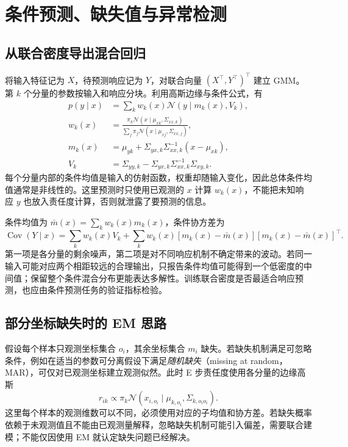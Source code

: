 \documentclass[UTF8,12pt,a4paper,fontset=fandol]{ctexart}
\begin{document}
\section{条件预测、缺失值与异常检测}
\label{sec:gmm-applications}

\subsection{从联合密度导出混合回归}
将输入特征记为 $X$，待预测响应记为 $Y$，对联合向量 $(X^\top,Y^\top)^\top$ 建立 GMM。第 $k$ 个分量的参数按输入和响应分块。利用高斯边缘与条件公式，有
\begin{align}
p(y\mid x)&=\sum_kw_k(x)\mathcal N(y\mid m_k(x),V_k),\label{eq:gmm-conditional-mixture}\\
w_k(x)&=\frac{\pi_k\mathcal N(x\mid\mu_{xk},\Sigma_{xx,k})}
{\sum_j\pi_j\mathcal N(x\mid\mu_{xj},\Sigma_{xx,j})},\nonumber\\
m_k(x)&=\mu_{yk}+\Sigma_{yx,k}\Sigma_{xx,k}^{-1}(x-\mu_{xk}),\nonumber\\
V_k&=\Sigma_{yy,k}-\Sigma_{yx,k}\Sigma_{xx,k}^{-1}\Sigma_{xy,k}.\nonumber
\end{align}
每个分量内部的条件均值是输入的仿射函数，权重却随输入变化，因此总体条件均值通常是非线性的。这里预测时只使用已观测的 $x$ 计算 $w_k(x)$，不能把未知响应 $y$ 也放入责任度计算，否则就泄露了要预测的信息。

条件均值为 $\bar m(x)=\sum_kw_k(x)m_k(x)$，条件协方差为
\[
\operatorname{Cov}(Y\mid x)=\sum_kw_k(x)V_k
+\sum_kw_k(x)[m_k(x)-\bar m(x)][m_k(x)-\bar m(x)]^\top.
\]
第一项是各分量的剩余噪声，第二项是对不同响应机制不确定带来的波动。若同一输入可能对应两个相距较远的合理输出，只报告条件均值可能得到一个低密度的中间值；保留整个条件混合分布更能表达多解性。训练联合密度是否最适合响应预测，也应由条件预测任务的验证指标检验。

\subsection{部分坐标缺失时的 EM 思路}
假设每个样本只观测坐标集合 $o_i$，其余坐标集合 $m_i$ 缺失。若缺失机制满足可忽略条件，例如在适当的参数可分离假设下满足\emph{随机缺失}（missing at random，MAR），可仅对已观测坐标建立观测似然。此时 E 步责任度使用各分量的边缘高斯
\[
r_{ik}\propto\pi_k\mathcal N(x_{i,o_i}\mid\mu_{k,o_i},\Sigma_{k,o_io_i}).
\]
这里每个样本的观测维数可以不同，必须使用对应的子均值和协方差。若缺失概率依赖于未观测值且不能由已观测量解释，忽略缺失机制可能引入偏差，需要联合建模；不能仅因使用 EM 就认定缺失问题已经解决。
\end{document}
